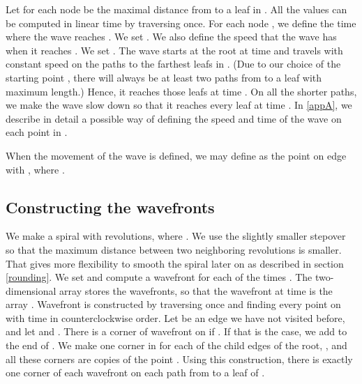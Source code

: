 \documentclass[3p]{elsarticle}
\begin{document}
Let  for each node  be the maximal distance from  to a leaf in .
All the  values can be computed in linear time by traversing  once.
For each node , we define the time  where the wave reaches .
We set . We also define the speed  that the wave has when it
reaches . We set .
The wave starts at the root at time 
and travels with constant speed  on the paths to the farthest leafs in .
(Due to our choice of the starting point , there will always be at least two paths
from  to a leaf with maximum length.)
Hence,
it reaches those leafs at time . On all the shorter paths, we make the wave slow down
so that it reaches every leaf at time .
In \ref{appA}, we describe in detail a possible way of defining the speed and time of the wave
on each point in .

When the movement of the wave is defined,
we may define  as the point on edge  with ,
where .

\subsection{Constructing the wavefronts}\label{constructingWavefronts}


We make a spiral with  revolutions, where
.
We use the slightly smaller stepover 
so that the maximum distance between two neighboring
revolutions is smaller. That gives more flexibility to smooth the spiral later on as described in section \ref{rounding}.
We set  and compute a wavefront for each of the times
. The two-dimensional array
 stores the wavefronts, so that the wavefront at time  is the array
. Wavefront  is constructed by traversing  once and finding every
point on  with time  in counterclockwise order.
Let  be an edge we have not visited before, and let  and
. There is a corner of wavefront  on  if
. If that is the case, we add
 to the end of .
We make one corner in  for each of the child edges of the root,
, and all these corners are copies of
the point . Using this construction,
there is exactly one corner of each wavefront on each path from
 to a leaf of .
\end{document}
